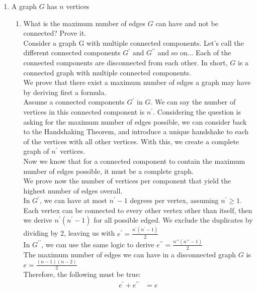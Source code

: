 \documentclass{article}
\begin{document}
  \begin{enumerate}[label=\textbf{11.17}]
    \item A graph $G$ has $n$ vertices
    \begin{enumerate}
      \item What is the maximum number of edges $G$ can have and not be connected? Prove it.\\[0.25in]
      Consider a graph G with multiple connected components. Let's call the different connected components $G^\prime$ and $G^{\prime\prime}$ and so on... Each of the connected components are disconnected from each other. In short, $G$ is a connected graph with multiple connected components.\\[0.25in]
      We prove that there exist a maximum number of edges a graph may have by deriving first a formula.\\[0.25in]
      Assume a connected components $G^\prime$ in $G$. We can say the number of vertices in this connected component is $n^\prime$. Considering the question is asking for the maximum number of edges possible, we can consider back to the Handshaking Theorem, and introduce a unique handshake to each of the vertices with all other vertices. With this, we create a complete graph of $n^\prime$ vertices.\\[0.25in]
      Now we know that for a connected component to contain the maximum number of edges possible, it must be a complete graph.\\[0.25in]
      We prove now the number of vertices per component that yield the highest number of edges overall.\\[0.25in]
      In $G^\prime$, we can have at most $n^\prime - 1$ degrees per vertex, assuming $n^\prime \geq 1$. Each vertex can be connected to every other vertex other than itself, then we derive $n^\prime (n^\prime - 1)$ for all possible edged. We exclude the duplicates by dividing by 2, leaving us with $e^\prime = \frac{n^\prime ( n^\prime - 1)}{2}$\\[0.25in]
      In $G^{\prime\prime}$, we can use the same logic to derive $e^{\prime\prime} = \frac{n{\prime\prime}(n{\prime\prime} - 1)}{2}$\\[0.25in]
      The maximum number of edges we can have in a disconnected graph $G$ is $e = \frac{(n-1)(n-2)}{2}$\\[0.25in]
      Therefore, the following must be true:
      \begin{align*}
        e^\prime + e^{\prime\prime} &= e\\

\end{align*}
\end{enumerate}
\end{enumerate}
\end{document}
